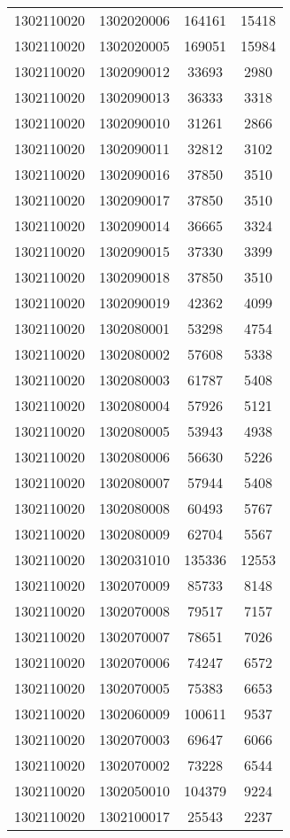 \begin{longtable}{llcc}
1302110020 & 1302020006 & 164161 & 15418\\
1302110020 & 1302020005 & 169051 & 15984\\
1302110020 & 1302090012 & 33693 & 2980\\
1302110020 & 1302090013 & 36333 & 3318\\
1302110020 & 1302090010 & 31261 & 2866\\
1302110020 & 1302090011 & 32812 & 3102\\
1302110020 & 1302090016 & 37850 & 3510\\
1302110020 & 1302090017 & 37850 & 3510\\
1302110020 & 1302090014 & 36665 & 3324\\
1302110020 & 1302090015 & 37330 & 3399\\
1302110020 & 1302090018 & 37850 & 3510\\
1302110020 & 1302090019 & 42362 & 4099\\
1302110020 & 1302080001 & 53298 & 4754\\
1302110020 & 1302080002 & 57608 & 5338\\
1302110020 & 1302080003 & 61787 & 5408\\
1302110020 & 1302080004 & 57926 & 5121\\
1302110020 & 1302080005 & 53943 & 4938\\
1302110020 & 1302080006 & 56630 & 5226\\
1302110020 & 1302080007 & 57944 & 5408\\
1302110020 & 1302080008 & 60493 & 5767\\
1302110020 & 1302080009 & 62704 & 5567\\
1302110020 & 1302031010 & 135336 & 12553\\
1302110020 & 1302070009 & 85733 & 8148\\
1302110020 & 1302070008 & 79517 & 7157\\
1302110020 & 1302070007 & 78651 & 7026\\
1302110020 & 1302070006 & 74247 & 6572\\
1302110020 & 1302070005 & 75383 & 6653\\
1302110020 & 1302060009 & 100611 & 9537\\
1302110020 & 1302070003 & 69647 & 6066\\
1302110020 & 1302070002 & 73228 & 6544\\
1302110020 & 1302050010 & 104379 & 9224\\
1302110020 & 1302100017 & 25543 & 2237\\

\end{longtable}
